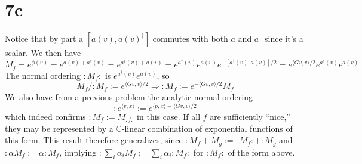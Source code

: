 \documentclass{article}
\begin{document}
\section*{7c}
Notice that by part a $[a(v),a(v)^{\dagger}]$ commutes with both $a$ and $a^{\dagger}$ since it's a scalar.
We then have
\[
  M_{f}=e^{\phi(v)}=e^{a(v)+a^{\dagger}(v)}=e^{a^{\dagger}(v)+a(v)}=e^{a^{\dagger}(v)}e^{a(v)}e^{-[a^{\dagger}(v),a(v)]/2}
  =e^{\langle Gv,v\rangle/2}e^{a^{\dagger}(v)}e^{a(v)}
\]
The normal ordering $:M_{f}:$ is $e^{a^{\dagger}(v)}e^{a(v)}$, so
\[
  M_{f}/:M_{f}:=e^{\langle Gv,v \rangle/2} \Rightarrow :M_{f}:=e^{-\langle Gv,v  \rangle/2}M_{f}
\]
We also have from a previous problem the analytic normal ordering
\[
  :e^{\langle v,x \rangle}:=e^{\langle p,x \rangle-\langle Gv,v \rangle/2}
\]
which indeed confirms $:M_{f}:=M_{:f:}$ in this case.
If all $f$ are sufficiently ``nice,'' they may be represented by a $\mathbb{C}$-linear combination of exponential functions of this form.
This result therefore generalizes, since $:M_{f}+M_{g}:=:M_{f}:+:M_{g}$ and $:\alpha M_{f}:=\alpha :M_{f}$, implying
$:\sum_{i}\alpha_{i}M_{f}:=\sum_{i}\alpha_{i}:M_{f}:$ for $:M_{f}:$ of the form above.
\end{document}
